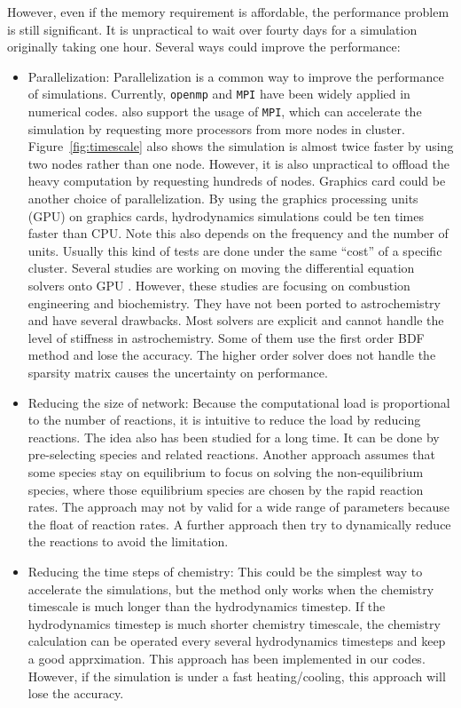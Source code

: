 However, even if the memory requirement is affordable, the performance problem is still significant. It is unpractical to wait over fourty days for a simulation originally taking one hour. Several ways could improve the performance:
\begin{itemize}
    \item Parallelization: Parallelization is a common way to improve the performance of simulations. Currently, {\tt openmp} and {\tt MPI} have been widely applied in numerical codes. {\ENZO} also support the usage of {\tt MPI}, which can accelerate the simulation by requesting more processors from more nodes in cluster. Figure~\ref{fig:timescale} also shows the simulation is almost twice faster by using two nodes rather than one node. However, it is also unpractical to offload the heavy computation by requesting hundreds of nodes. Graphics card could be another choice of parallelization. By using the graphics processing units (GPU) on graphics cards, hydrodynamics simulations could be ten times faster than CPU\cite{Schive2010}. Note this also depends on the frequency and the number of units. Usually this kind of tests are done under the same ``cost'' of a specific cluster. Several studies are working on moving the differential equation solvers onto GPU \cite{Niemeyer2014, Curtis2016, odeint, cuda-sim(culsoda), Stone2018}. However, these studies are focusing on combustion engineering and biochemistry. They have not been ported to astrochemistry and have several drawbacks. Most solvers are explicit and cannot handle the level of stiffness in astrochemistry. Some of them use the first order BDF method and lose the accuracy. The higher order solver does not handle the sparsity matrix causes the uncertainty on performance.
    \item Reducing the size of network: Because the computational load is proportional to the number of reactions, it is intuitive to reduce the load by reducing reactions. The idea also has been studied for a long time. It can be done by pre-selecting species and related reactions\cite{Nelson1999}. Another approach assumes that some species stay on equilibrium to focus on solving the non-equilibrium species\cite{Lam1993, Glover2010}, where those equilibrium species are chosen by the rapid reaction rates. The approach may not by valid for a wide range of parameters because the float of reaction rates. A further approach then try to dynamically reduce the reactions to avoid the limitation\cite{Tupper2002, Grassi2012}.
    \item Reducing the time steps of chemistry: This could be the simplest way to accelerate the simulations, but the method only works when the chemistry timescale is much longer than the hydrodynamics timestep. If the hydrodynamics timestep is much shorter chemistry timescale, the chemistry calculation can be operated every several hydrodynamics timesteps and keep a good apprximation. This approach has been implemented in our {\ENZO} codes. However, if the simulation is under a fast heating/cooling, this approach will lose the accuracy.

\end{itemize}
